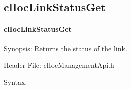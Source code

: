 \begin{flushleft}
\subsection{clIocLinkStatusGet}
\hypertarget{pageioc212}{}\paragraph{cl\-Ioc\-Link\-Status\-Get}\label{pageioc212}
\begin{Desc}
\item[Synopsis:]Returns the status of the link.\end{Desc}
\begin{Desc}
\item[Header File:]clIocManagementApi.h\end{Desc}
\begin{Desc}
\item[Syntax:]


\end{Desc}
\end{flushleft}
